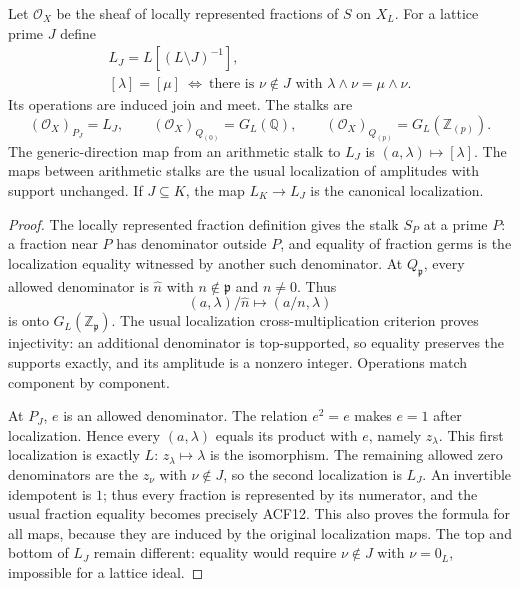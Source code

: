 \begin{proposition}
Let $\mathcal O_X$ be the sheaf of locally represented fractions of $S$
on $X_L$. For a lattice prime $J$ define
\begin{equation}\tag{ACF12}
 \begin{gathered}
 L_J=L[(L\setminus J)^{-1}],\\
 [\lambda]=[\mu]\ \Longleftrightarrow\
 \text{there is }\nu\notin J\text{ with }
                  \lambda\wedge\nu=\mu\wedge\nu.
 \end{gathered}
\end{equation}
Its operations are induced join and meet. The stalks are
\begin{equation}\tag{ACF13}
 (\mathcal O_X)_{P_J}=L_J,\qquad
 (\mathcal O_X)_{Q_{(0)}}=G_L(\mathbb Q),\qquad
 (\mathcal O_X)_{Q_{(p)}}=G_L(\mathbb Z_{(p)}).
\end{equation}
The generic-direction map from an arithmetic stalk to $L_J$ is
$(a,\lambda)\mapsto[\lambda]$. The maps between arithmetic stalks
are the usual localization of amplitudes with support unchanged.
If $J\subseteq K$, the map $L_K\to L_J$ is the canonical localization.
\end{proposition}
\begin{proof}
The locally represented fraction definition gives the stalk $S_P$ at
a prime $P$: a fraction near $P$ has denominator outside $P$, and equality
of fraction germs is the localization equality witnessed by another
such denominator. At $Q_{\mathfrak p}$, every allowed denominator is
$\widehat n$ with $n\notin\mathfrak p$ and $n\ne0$. Thus
\[
 (a,\lambda)/\widehat n\longmapsto(a/n,\lambda)
\]
is onto $G_L(\mathbb Z_{\mathfrak p})$. The usual localization
cross-multiplication criterion proves injectivity: an additional
denominator is top-supported, so equality preserves the supports
exactly, and its amplitude is a nonzero integer. Operations match
component by component.

At $P_J$, $e$ is an allowed denominator. The relation $e^2=e$ makes $e=1$
after localization. Hence every $(a,\lambda)$ equals its product with
$e$, namely $z_\lambda$. This first localization is exactly $L$:
$z_\lambda\mapsto\lambda$ is the isomorphism. The remaining allowed
zero denominators are the $z_\nu$ with $\nu\notin J$, so the second
localization is $L_J$. An invertible idempotent is $1$; thus every
fraction is represented by its numerator, and the usual fraction
equality becomes precisely ACF12. This also proves the formula for
all maps, because they are induced by the original localization maps.
The top and bottom of $L_J$ remain different: equality would require
$\nu\notin J$ with $\nu=0_L$, impossible for a lattice ideal.
\end{proof}

